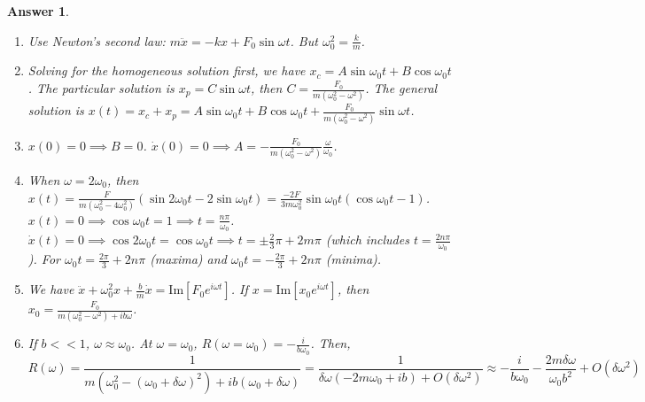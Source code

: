 \documentclass[a4paper]{article}
\newtheorem{ans}{Answer}[subsection]
\theoremstyle{new}
\begin{document}
\begin{ans}\leavevmode
\begin{enumerate}[label=(\roman*)]
\item Use Newton's second law: $m\ddot{x}=-kx+F_0\sin\omega t$. But $\omega_0^2=\frac{k}{m}$.
\item Solving for the homogeneous solution first, we have $x_c=A\sin\omega_0 t+B\cos\omega_0t$. The particular solution is $x_p=C\sin\omega t$, then $C=\frac{F_0}{m(\omega_0^2-\omega^2)}$. The general solution is $x(t)=x_c+x_p=A\sin\omega_0t+B\cos\omega_0t+\frac{F_0}{m(\omega_0^2-\omega^2)}\sin\omega t$.
\item $x(0)=0\implies B=0$. $\dot{x}(0)=0\implies A=-\frac{F_0}{m(\omega_0^2-\omega^2)}\frac{\omega}{\omega_0}$.
\item When $\omega=2\omega_0$, then $x(t)=\frac{F}{m(\omega_0^2-4\omega_0^2)}(\sin2\omega_0t-2\sin\omega_0t)=\frac{-2F}{3m\omega_0^2}\sin\omega_0t(\cos\omega_0t-1)$. $x(t)=0\implies\cos\omega_0t=1\implies t=\frac{n\pi}{\omega_0}$. $\dot{x}(t)=0\implies\cos2\omega_0t=\cos\omega_0t\implies t=\pm\frac{2}{3}\pi+2m\pi$ (which includes $t=\frac{2n\pi}{\omega_0}$). For $\omega_0t=\frac{2\pi}{3}+2n\pi$ (maxima) and $\omega_0t=-\frac{2\pi}{3}+2n\pi$ (minima). 
\begin{center}
\end{center}
\item We have $\ddot{x}+\omega_0^2x+\frac{b}{m}\dot{x}=\text{Im}[F_0e^{i\omega t}]$. If $x=\text{Im}[x_0e^{i\omega t}]$, then $x_0=\frac{F_0}{m(\omega_0^2-\omega^2)+ib\omega}$.
\item If $b<<1$, $\omega\approx\omega_0$. At $\omega=\omega_0$, $R(\omega=\omega_0)=-\frac{i}{b\omega_0}$. Then,
$$R(\omega)=\frac{1}{m(\omega_0^2-(\omega_0+\delta\omega)^2)+ib(\omega_0+\delta\omega)}=\frac{1}{\delta\omega(-2m\omega_0+ib)+O(\delta\omega^2)}\approx-\frac{i}{b\omega_0}-\frac{2m\delta\omega}{\omega_0b^2}+O(\delta\omega^2)$$
\end{enumerate}
\end{ans}
\newpage
\end{document}
